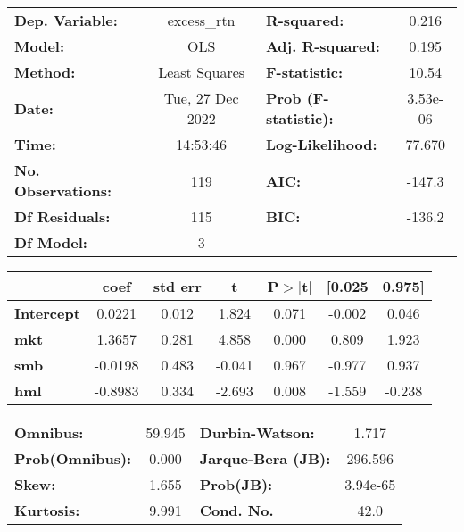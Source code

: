 \documentclass{report}
\begin{document}
\begin{center}
\begin{tabular}{lclc}
\toprule
\textbf{Dep. Variable:}    &   excess\_rtn    & \textbf{  R-squared:         } &     0.216   \\
\textbf{Model:}            &       OLS        & \textbf{  Adj. R-squared:    } &     0.195   \\
\textbf{Method:}           &  Least Squares   & \textbf{  F-statistic:       } &     10.54   \\
\textbf{Date:}             & Tue, 27 Dec 2022 & \textbf{  Prob (F-statistic):} &  3.53e-06   \\
\textbf{Time:}             &     14:53:46     & \textbf{  Log-Likelihood:    } &    77.670   \\
\textbf{No. Observations:} &         119      & \textbf{  AIC:               } &    -147.3   \\
\textbf{Df Residuals:}     &         115      & \textbf{  BIC:               } &    -136.2   \\
\textbf{Df Model:}         &           3      & \textbf{                     } &             \\
\bottomrule
\end{tabular}
\begin{tabular}{lcccccc}
                   & \textbf{coef} & \textbf{std err} & \textbf{t} & \textbf{P$> |$t$|$} & \textbf{[0.025} & \textbf{0.975]}  \\
\midrule
\textbf{Intercept} &       0.0221  &        0.012     &     1.824  &         0.071        &       -0.002    &        0.046     \\
\textbf{mkt}       &       1.3657  &        0.281     &     4.858  &         0.000        &        0.809    &        1.923     \\
\textbf{smb}       &      -0.0198  &        0.483     &    -0.041  &         0.967        &       -0.977    &        0.937     \\
\textbf{hml}       &      -0.8983  &        0.334     &    -2.693  &         0.008        &       -1.559    &       -0.238     \\
\bottomrule
\end{tabular}
\begin{tabular}{lclc}
\textbf{Omnibus:}       & 59.945 & \textbf{  Durbin-Watson:     } &    1.717  \\
\textbf{Prob(Omnibus):} &  0.000 & \textbf{  Jarque-Bera (JB):  } &  296.596  \\
\textbf{Skew:}          &  1.655 & \textbf{  Prob(JB):          } & 3.94e-65  \\
\textbf{Kurtosis:}      &  9.991 & \textbf{  Cond. No.          } &     42.0  \\
\bottomrule
\end{tabular}
\end{center}
\end{document}
